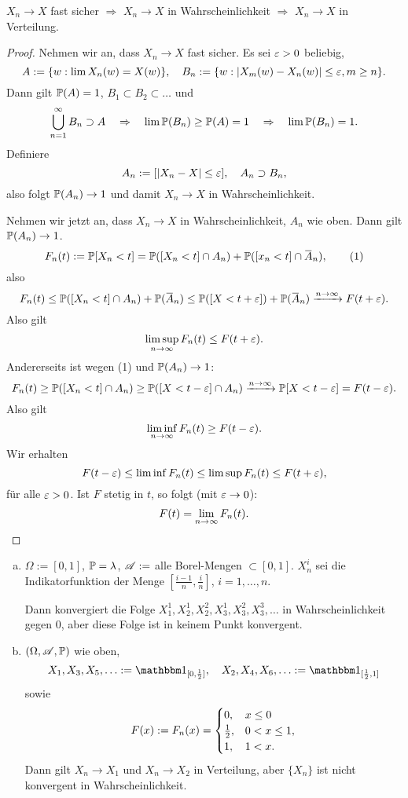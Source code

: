 \begin{thm}
  $X_n \to X$ fast sicher $\Rightarrow$ $X_n \to X$ in Wahrscheinlichkeit
  $\Rightarrow$ $X_n \to X$ in Verteilung.
\end{thm}

\begin{proof}
  Nehmen wir an, dass $X_n \to X$ fast sicher. Es sei $\varepsilon > 0$ beliebig,
  \[ A:= \{ w : \lim X_n(w) = X(w) \}, \quad
    B_n := \{ w : |X_m(w) - X_n(w) | \le \varepsilon, m \ge n \}. \]
  Dann gilt $\mathbb{P}(A) = 1$, $B_1 \subset B_2 \subset \ldots$ und
  \[ \bigcup_{n=1}^\infty B_n \supset A \quad \Rightarrow \quad \lim \mathbb{P}(B_n) \ge \mathbb{P}(A) = 1
    \quad \Rightarrow \quad \lim \mathbb{P}(B_n) = 1. \]
  Definiere
  \[ A_n := [ |X_n - X| \le \varepsilon], \quad A_n \supset B_n, \]
  also folgt $\mathbb{P}(A_n) \to 1$ und damit $X_n \to X$ in Wahrscheinlichkeit.

  Nehmen wir jetzt an, dass $X_n \to X$ in Wahrscheinlichkeit, $A_n$ wie oben.
  Dann gilt $\mathbb{P}(A_n) \to 1$.
  \[ F_n(t) := \pP[X_n < t] = \pP([X_n < t] \cap A_n) + \pP([x_n < t] \cap
    \obar{A}_n), \tag{1} \]
  also
  \[ F_n(t) \le \pP([X_n < t] \cap A_n) + \pP( \obar{A}_n)  \le
    \pP([X< t + \eps ]) + \pP(\obar{A}_n)
    \xrightarrow{n \to \infty} F(t + \eps). \]
  Also gilt
  \[ \limsup_{n \to \infty} F_n(t) \le F(t+\varepsilon). \]
  Andererseits ist wegen (1) und $\mathbb{P}(A_n) \to 1$:
  \[ F_n(t) \ge \mathbb{P}( [X_n < t] \cap A_n) \ge \mathbb{P}([X < t - \varepsilon] \cap A_n)
    \xrightarrow{n \to \infty} \mathbb{P}[X < t - \varepsilon] = F(t - \varepsilon). \]
  Also gilt
  \[ \liminf_{n \to \infty} F_n(t) \ge F(t-\varepsilon). \]
  Wir erhalten
  \[ F(t-\varepsilon) \le \liminf F_n(t) \le \limsup F_n(t) \le F(t + \varepsilon), \]
  für alle $\varepsilon > 0$. Ist $F$ stetig in $t$, so folgt (mit $\varepsilon \to 0$):
  \[ F(t) = \lim_{n \to \infty} F_n(t). \qedhere \]
\end{proof}

\begin{exmp}
  \begin{enumerate}[(a)]
  \item $\Omega := [0,1]$, $\mathbb{P} = \lambda$, $\mathscr{A} :=$ alle Borel-Mengen $\subset
    [0,1]$. $X_n^i$ sei die Indikatorfunktion der Menge $\left[  \frac{i-1}{n},
      \frac{i}{n} \right]$, $i = 1, \ldots, n$.

    Dann konvergiert die Folge $X_1^1, X_2^1, X_2^2, X_3^1, X_3^2, X_3^3,
    \ldots$ in Wahrscheinlichkeit gegen 0, aber diese Folge ist in keinem Punkt
    konvergent.
  \item $(\Omega, \mathscr{A}, \mathbb{P})$ wie oben,
    \[ X_1, X_3, X_5, \ldots := \ind_{[0,\rez{2}]}, \quad X_2, X_4, X_6,
      \ldots := \ind_{[\rez{2}, 1]} \]
    sowie
    \[ F(x) := F_n(x) =
      \begin{cases}
        0, & x \le 0 \\
        \frac{1}{2}, & 0 < x \le 1, \\
        1, & 1 < x.
      \end{cases}
    \]
    Dann gilt $X_n \to X_1$ und $X_n \to X_2$ in Verteilung, aber $\{X_n\}$ ist
    nicht konvergent in Wahrscheinlichkeit.
  \end{enumerate}
\end{exmp}

